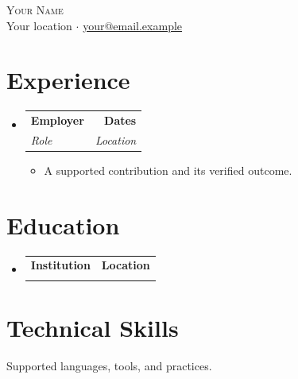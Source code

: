 \documentclass[letterpaper,11pt]{article}
\makeatletter
\newcommand{\link}[2]{\href{#1}{\textcolor{linkblue}{\underline{#2}}}}
\newcommand{\resumeItem}[1]{
  \item\small{
    {#1 \vspace{-2pt}}
  }
}
\newcommand{\resumeSubheading}[4]{
  \vspace{-2pt}\item
    \begin{tabular*}{1.0\textwidth}[t]{l@{\extracolsep{\fill}}r}
      \textbf{#1} & \textbf{\small #2}\\
      \textit{#3} & \textit{#4} \\
    \end{tabular*}\vspace{-7pt}
}
\newcommand{\resumeSubheadingWithDesc}[4]{
  \vspace{-2pt}\item
    \begin{tabular*}{1.0\textwidth}[t]{l@{\extracolsep{\fill}}r}
      \textbf{#1} & \textbf{\small #2}\\
      \text{#3} & \text{#4}
    \end{tabular*}\vspace{-7pt}
}
\newcommand{\resumeSubHeadingListStart}{\begin{itemize}[leftmargin=0.0in, label={}]}
\newcommand{\resumeSubHeadingListEnd}{\end{itemize}}
\newcommand{\resumeItemListStart}{\begin{itemize}[leftmargin=0.12in, rightmargin=0in]}
\newcommand{\resumeItemListEnd}{\end{itemize}\vspace{-5pt}}
\makeatother
\begin{document}
\begin{center}
  {\Huge \scshape Your Name} \\ \vspace{1pt}
  Your location $\cdot$ \link{mailto:your@email.example}{your@email.example}
\end{center}

\section{Experience}
\resumeSubHeadingListStart
  \resumeSubheading{Employer}{Dates}{Role}{Location}
  \resumeItemListStart
    \resumeItem{A supported contribution and its verified outcome.}
  \resumeItemListEnd
\resumeSubHeadingListEnd

\section{Education}
\resumeSubHeadingListStart
  \resumeSubheadingWithDesc{Institution}{Location}{Degree or program}{Dates}
\resumeSubHeadingListEnd

\section{Technical Skills}
\small{Supported languages, tools, and practices.}
\end{document}
